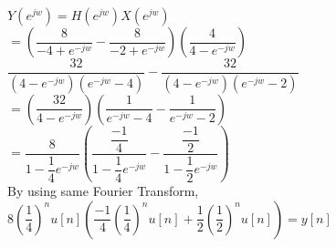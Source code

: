 \documentclass[10pt,a4paper, margin=1in]{article}
\begin{document}
\begin{enumerate}
\begin{enumerate}
    $Y(e^{jw}) = H(e^{jw}) X(e^{jw})$\\
    
    $=(\dfrac{8}{-4 + e^{-jw}} - \dfrac{8}{-2 + e^{-jw}})(\dfrac{4}{4-e^{-jw}})$\\
    
    $\dfrac{32}{(4-e^{-jw})(e^{-jw}-4)} -  \dfrac{32}{(4-e^{-jw})(e^{-jw}-2)}$\\
    
    $=(\dfrac{32}{4-e^{-jw}})(\dfrac{1}{e^{-jw}-4} -\dfrac{1}{e^{-jw}-2})$\\
    
    $=\dfrac{8}{1-\dfrac{1}{4}e^{-jw}}(\dfrac{\dfrac{-1}{4}}{1-\dfrac{1}{4}e^{-jw}}-\dfrac{\dfrac{-1}{2}}{1-\dfrac{1}{2}e^{-jw}})$\\
    
    By using same Fourier Transform,\\
    
    $8(\dfrac{1}{4})^n u[n](\dfrac{-1}{4}(\dfrac{1}{4})^n u[n] + \dfrac{1}{2}(\dfrac{1}{2})^n u[n]) = y[n]$
    \end{enumerate}



\end{enumerate}
\end{document}
